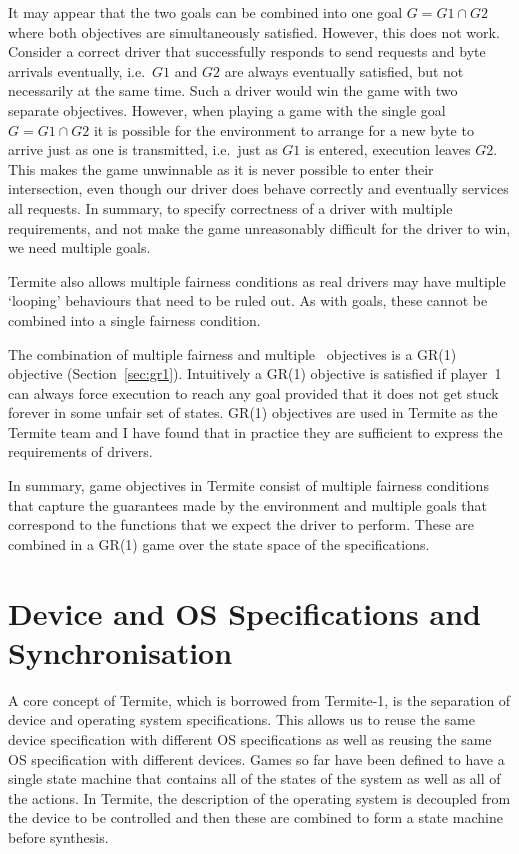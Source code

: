 It may appear that the two goals can be combined into one goal $G = G1 \cap G2$ where both objectives are simultaneously satisfied. However, this does not work. Consider a correct driver that successfully responds to send requests and byte arrivals eventually, i.e.\ $G1$ and $G2$ are always eventually satisfied, but not necessarily at the same time. Such a driver would win the game with two separate objectives. However, when playing a game with the single goal $G = G1 \cap G2$ it is possible for the environment to arrange for a new byte to arrive just as one is transmitted, i.e.\ just as $G1$ is entered, execution leaves $G2$. This makes the game unwinnable as it is never possible to enter their intersection, even though our driver does behave correctly and eventually services all requests. In summary, to specify correctness of a driver with multiple requirements, and not make the game unreasonably difficult for the driver to win, we need multiple goals. 

Termite also allows multiple fairness conditions as real drivers may have multiple `looping' behaviours that need to be ruled out. As with goals, these cannot be combined into a single fairness condition.

The combination of multiple fairness and multiple \buchi\ objectives is a GR(1) objective (Section~\ref{sec:gr1}). Intuitively a GR(1) objective is satisfied if player~1 can always force execution to reach any goal provided that it does not get stuck forever in some unfair set of states. GR(1) objectives are used in Termite as the Termite team and I have found that in practice they are sufficient to express the requirements of drivers. 

In summary, game objectives in Termite consist of multiple fairness conditions that capture the guarantees made by the environment and multiple goals that correspond to the functions that we expect the driver to perform. These are combined in a GR(1) game over the state space of the specifications.

\section{Device and OS Specifications and Synchronisation}
\label{sec:composition}

A core concept of Termite, which is borrowed from Termite-1, is the separation of device and operating system specifications. This allows us to reuse the same device specification with different OS specifications as well as reusing the same OS specification with different devices. Games so far have been defined to have a single state machine that contains all of the states of the system as well as all of the actions. In Termite, the description of the operating system is decoupled from the device to be controlled and then these are combined to form a state machine before synthesis.

